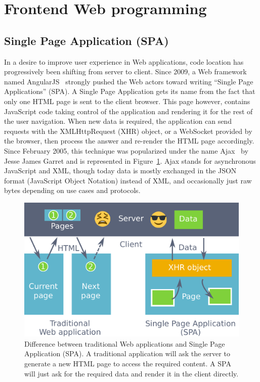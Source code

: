 \section{Frontend Web programming}%
\label{sec:frontend_web_programming}


\subsection{Single Page Application (SPA)}%
\label{sub:single_page_application_spa_}

In a desire to improve user experience in Web applications,
code location has progressively been shifting from server to client.
Since 2009, a Web framework named AngularJS~\cite{hevery2009declarative} strongly pushed
the Web actors toward writing ``Single Page Applications'' (SPA).
A Single Page Application gets its name from the fact that only one
HTML page is sent to the client browser.
This page however, contains JavaScript code taking control
of the application and rendering it for the rest of the user navigation.
When new data is required, the application can send requests
with the XMLHttpRequest (XHR) object, or a WebSocket provided by the browser,
then process the answer and re-render the HTML page accordingly.
Since February 2005, this technique was popularized under the name Ajax~\cite{ajax}
by Jesse James Garret and is represented in Figure~\ref{fig:spa}.
Ajax stands for asynchronous JavaScript and XML,
though today data is mostly exchanged in the JSON format (JavaScript Object Notation) instead of XML,
and occasionally just raw bytes depending on use cases and protocols.

\begin{figure}[ht]
	\centering
	\includegraphics[width=1.0\linewidth]{assets/img/spa-bis.pdf}
	\caption{Difference between traditional Web applications and Single Page Application (SPA). A traditional application will ask the server to generate a new HTML page to access the required content. A SPA will just ask for the required data and render it in the client directly.}%
	\label{fig:spa}
\end{figure}


